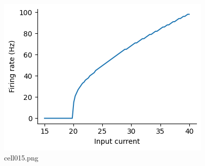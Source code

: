 \begin{figure}[ht]
	\centering
	\includegraphics[scale=0.8, max width=\linewidth]{./fig/neuron-model/lif/cell015.png}
	\caption{cell015.png}
	\label{cell015.png}
\end{figure}